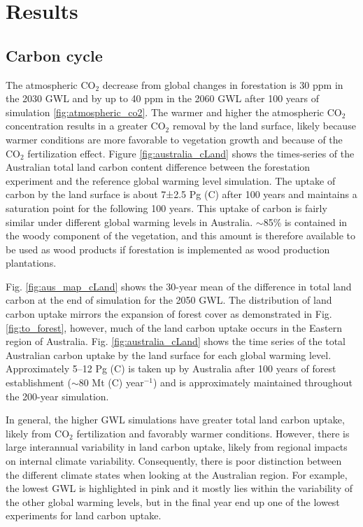 \documentclass[]{article}
\begin{document}
\section{Results}

\subsection{Carbon cycle}

The atmospheric CO$_2$ decrease from global changes in forestation is 30 ppm in the 2030 GWL and by up to 40 ppm in the 2060 GWL after 100 years of simulation \ref{fig:atmospheric_co2}.
The warmer and higher the atmospheric CO$_2$ concentration results in a greater CO$_2$ removal by the land surface, likely because warmer conditions are more favorable to vegetation growth and because of the CO$_2$ fertilization effect.
Figure \ref{fig:australia_cLand} shows the times-series of the Australian total land carbon content difference between the forestation experiment and the reference global warming level simulation.
The uptake of carbon by the land surface is about 7±2.5 Pg (C) after 100 years and maintains a saturation point for the following 100 years.
This uptake of carbon is fairly similar under different global warming levels in Australia.
$\sim$85\% is contained in the woody component of the vegetation, and this amount is therefore available to be used as wood products if forestation is implemented as wood production plantations.

Fig. \ref{fig:aus_map_cLand} shows the 30-year mean of the difference in total land carbon at the end of simulation for the 2050 GWL.
The distribution of land carbon uptake mirrors the expansion of forest cover as demonstrated in Fig. \ref{fig:to_forest}, however, much of the land carbon uptake occurs in the Eastern region of Australia.
Fig. \ref{fig:australia_cLand} shows the time series of the total Australian carbon uptake by the land surface for each global warming level.
Approximately 5--12 Pg (C) is taken up by Australia after 100 years of forest establishment ($\sim$80 Mt (C) year$^{-1}$) and is approximately maintained throughout the 200-year simulation.

In general, the higher GWL simulations have greater total land carbon uptake, likely from CO$_2$ fertilization and favorably warmer conditions.
However, there is large interannual variability in land carbon uptake, likely from regional impacts on internal climate variability.
Consequently, there is poor distinction between the different climate states when looking at the Australian region.
For example, the lowest GWL is highlighted in pink and it mostly lies within the variability of the other global warming levels, but in the final year end up one of the lowest experiments for land carbon uptake.
\end{document}
